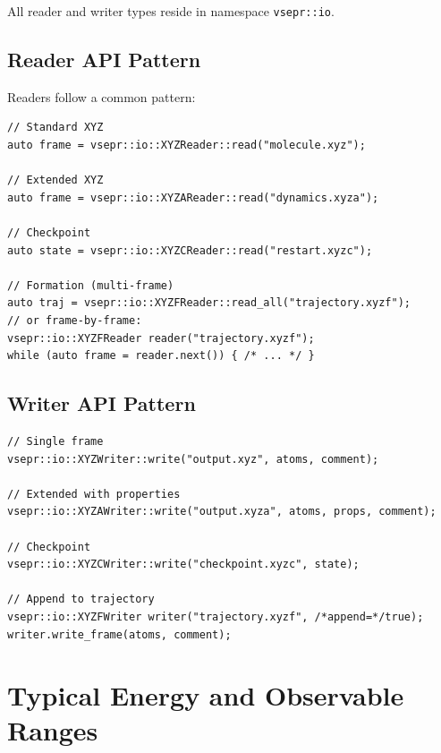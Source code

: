 \documentclass[12pt, a4paper, oneside]{article}
\newcommand{\type}[1]{\texttt{#1}}
\begin{document}
All reader and writer types reside in namespace \type{vsepr::io}.

\subsection{Reader API Pattern}

Readers follow a common pattern:

\begin{lstlisting}
// Standard XYZ
auto frame = vsepr::io::XYZReader::read("molecule.xyz");

// Extended XYZ
auto frame = vsepr::io::XYZAReader::read("dynamics.xyza");

// Checkpoint
auto state = vsepr::io::XYZCReader::read("restart.xyzc");

// Formation (multi-frame)
auto traj = vsepr::io::XYZFReader::read_all("trajectory.xyzf");
// or frame-by-frame:
vsepr::io::XYZFReader reader("trajectory.xyzf");
while (auto frame = reader.next()) { /* ... */ }
\end{lstlisting}

\subsection{Writer API Pattern}

\begin{lstlisting}
// Single frame
vsepr::io::XYZWriter::write("output.xyz", atoms, comment);

// Extended with properties
vsepr::io::XYZAWriter::write("output.xyza", atoms, props, comment);

// Checkpoint
vsepr::io::XYZCWriter::write("checkpoint.xyzc", state);

// Append to trajectory
vsepr::io::XYZFWriter writer("trajectory.xyzf", /*append=*/true);
writer.write_frame(atoms, comment);
\end{lstlisting}

\section{Typical Energy and Observable Ranges}
\label{sec:ranges}
\end{document}
